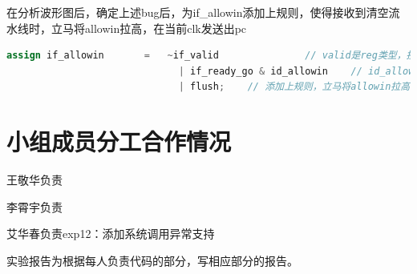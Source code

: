 \documentclass[11pt]{article}
\begin{document}
在分析波形图后，确定上述bug后，为if\_allowin添加上规则，使得接收到清空流水线时，立马将allowin拉高，在当前clk发送出pc

\begin{lstlisting}[language=verilog]
  assign if_allowin       =   ~if_valid               // valid是reg类型，接受flush后最快下一个clk才能拉低
                              | if_ready_go & id_allowin    // id_allowin可能由于读后写阻塞，拉低
                              | flush;    // 添加上规则，立马将allowin拉高，在当前clk发送出pc
\end{lstlisting}



\vspace{1ex}

\section{小组成员分工合作情况}
王敬华负责

李霄宇负责

艾华春负责exp12：添加系统调用异常支持

实验报告为根据每人负责代码的部分，写相应部分的报告。
\end{document}

